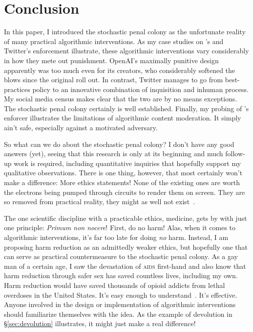 \section{Conclusion}
\label{sec:conclusion}

In this paper, I introduced the stochastic penal colony as the unfortunate
reality of many practical algorithmic interventions. As my case studies on
\DALLE's and Twitter's enforcement illustrate, these algorithmic interventions
vary considerably in how they mete out punishment. OpenAI's maximally punitive
design apparently was too much even for its creators, who considerably softened
the blows since the original roll out. In contrast, Twitter manages to go from
best-practices policy to an innovative combination of inquisition and inhuman
process. My social media census makes clear that the two are by no means
exceptions. The stochastic penal colony certainly is well established. Finally,
my probing of \DALLE's enforcer illustrates the limitations of algorithmic
content moderation. It simply ain't safe, especially against a motivated
adversary.

So what can we do about the stochastic penal colony? I don't have any good
answers (yet), seeing that this research is only at its beginning and much
follow-up work is required, including quantitative inquiries that hopefully
support my qualitative observations. There is one thing, however, that most
certainly won't make a difference: More  ethics statements! None of the
existing ones are worth the electrons being pumped through circuits to render
them on screen. They are so removed from practical reality, they might as well
not exist~\cite{Hagendorff2022,Munn2022,WhittlestoneNyrupea2019}.

The one scientific discipline with a practicable ethics, medicine, gets by with
just one principle: \emph{Primum non nocere}! First, do no harm! Alas, when it
comes to algorithmic interventions, it's far too late for doing \emph{no} harm.
Instead, I am proposing harm reduction as an admittedly weaker  ethics,
but hopefully one that can serve as practical countermeasure to the stochastic
penal colony. As a gay man of a certain age, I saw the devastation of
\textsc{aids} first-hand and also know that harm reduction through safer sex has
saved countless lives, including my own. Harm reduction would have saved
thousands of opioid addicts from lethal overdoses in the United States. It's
easy enough to
understand~\cite{HRI2020,HRI2022,Interlandi2023,MarlattLarimerea2011,OpenSocietyFoundations2021}.
It's effective. Anyone involved in the design or implementation of algorithmic
interventions should familiarize themselves with the idea. As the example of
devolution in \S\ref{sec:devolution} illustrates, it might just make a real
difference!
